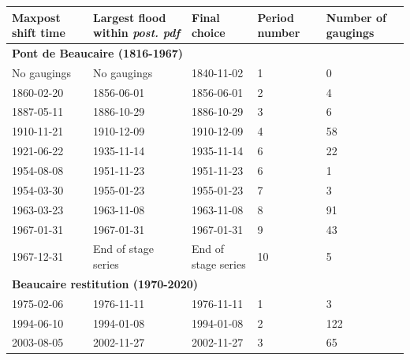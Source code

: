 \documentclass[11pt]{article}
\begin{document}
    \begin{center}
        \begin{table}[h!]
        \centering
            \begin{tabular}{|m{2.5cm}|m{3.5cm}|m{3.5cm}|m{1.5cm}|m{2.5cm}|}
                \firsthline
                \textbf{Maxpost shift time}  &  \textbf{Largest flood within \textit{post. pdf}} &  \textbf{Final choice} & \textbf{Period number} & \textbf{Number of gaugings}  \\
                \hline
                \multicolumn{5}{|l|}{\textbf{Pont de Beaucaire (1816-1967)}} \\
                \hline
                No gaugings     &      No gaugings   &   1840-11-02 & 1 & 0 \\
                \hline
                1860-02-20     &       1856-06-01  &   1856-06-01   & 2 & 4 \\
                \hline
                1887-05-11     &       1886-10-29  &   1886-10-29   & 3 & 6\\
                \hline
                1910-11-21     &       1910-12-09  &   1910-12-09  & 4 & 58 \\
                \hline
                1921-06-22     &       1935-11-14  &   1935-11-14   & 6 & 22 \\
                \hline
                1954-08-08    &       1951-11-23  &   1951-11-23   & 6 & 1\\
                \hline
                1954-03-30     &       1955-01-23  &   1955-01-23   & 7 & 3 \\
                \hline
                1963-03-23     &       1963-11-08  &   1963-11-08   & 8 & 91 \\
                \hline
                1967-01-31     &       1967-01-31  &   1967-01-31  & 9 & 43\\
                \hline
                1967-12-31      &       End of stage series & End of stage series & 10 & 5\\
                \hline
                \multicolumn{5}{|l|}{\textbf{Beaucaire restitution (1970-2020)}} \\
                \hline
                1975-02-06     &       1976-11-11  &   1976-11-11 & 1 & 3\\
                \hline
                1994-06-10     &       1994-01-08  &   1994-01-08   & 2 & 122 \\
                \hline
                2003-08-05     &       2002-11-27  &   2002-11-27  & 3 & 65 \\

\end{tabular}
\end{table}
\end{center}
\end{document}
